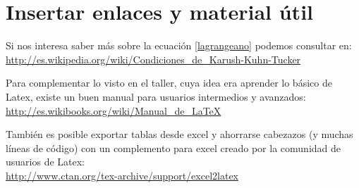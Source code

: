 \documentclass[letterpaper,twoside]{article}
\begin{document}
\newpage

\section{Insertar enlaces y material \'util}


Si nos interesa saber m\'as sobre la ecuaci\'on \eqref{lagrangeano} podemos consultar en:\\
\url{http://es.wikipedia.org/wiki/Condiciones_de_Karush-Kuhn-Tucker}

Para complementar lo visto en el taller, cuya idea era aprender lo b\'asico de Latex, existe un buen manual para usuarios intermedios y avanzados:\\ 
\url{http://es.wikibooks.org/wiki/Manual_de_LaTeX}

Tambi\'en es posible exportar tablas desde excel y ahorrarse cabezazos (y muchas l\'ineas de c\'odigo) con un complemento para excel creado por la comunidad de usuarios de Latex:\\
\url{http://www.ctan.org/tex-archive/support/excel2latex} 
\end{document}

